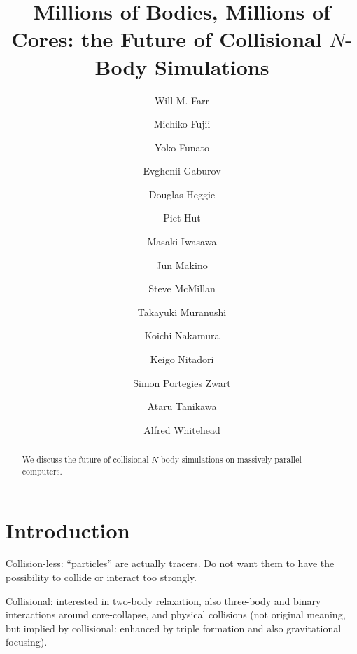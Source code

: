 \documentclass[5p,authoryear]{elsarticle}
\begin{document}
\title{Millions of Bodies, Millions of Cores: the Future of
  Collisional $N$-Body Simulations}

\author[WMF]{Will M. Farr}
\author[MF]{Michiko Fujii}
\author[YF]{Yoko Funato}
\author[EG]{Evghenii Gaburov}
\author[DH]{Douglas Heggie}
\author[PH]{Piet Hut}
\author[MI]{Masaki Iwasawa}
\author[JM]{Jun Makino}
\author[SM]{Steve McMillan}
\author[TM]{Takayuki Muranushi}
\author[KN]{Koichi Nakamura}
\author[KN]{Keigo Nitadori}
\author[SZ]{Simon Portegies Zwart}
\author[AT]{Ataru Tanikawa}
\author[AW]{Alfred Whitehead}


\address[WMF]{Northwestern Center for Interdisciplinary Research in
  Astrophysics, 2145 Sheridan Rd., Evanston IL 60208 USA}

\address[PH]{Institute
  for Advanced Study, Princeton, NJ 08540, USA}

\address[JM]{Interactive Research Center of Science, Graduate
  School of Science and Engineering Tokyo Institute of Technology,
  2--12--1 Ookayama, Meguro, Tokyo 152-8551, Japan}

\begin{abstract}
  We discuss the future of collisional $N$-body simulations on
  massively-parallel computers.
\end{abstract}

\maketitle

\section{Introduction}

Collision-less: ``particles'' are actually tracers.  Do not want them
to have the possibility to collide or interact too strongly.

Collisional: interested in two-body relaxation, also three-body and
binary interactions around core-collapse, and physical collisions (not
original meaning, but implied by collisional: enhanced by triple
formation and also gravitational focusing).
\end{document}
